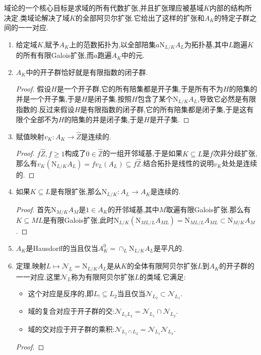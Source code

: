 域论的一个核心目标是求域的所有代数扩张,并且扩张理应被基域$K$内部的结构所决定.类域论解决了域$K$的全部阿贝尔扩张.它给出了这样的扩张和$A_K$的特定子群之间的一一对应.
\begin{enumerate}
	\item 给定域$K$,赋予$A_K$上的范数拓扑为,以全部陪集$a\mathrm{N}_{L/K}A_L$为拓扑基,其中$L$跑遍$K$的所有有限Galois扩张,而$a$跑遍$A_K$中的元.
	\item $A_K$中的开子群恰好就是有限指数的闭子群.
	\begin{proof}
		
		假设$H$是一个开子群,它的所有陪集都是开子集,于是所有不为$H$的陪集的并是一个开子集,于是$H$是闭子集.按照$H$包含了某个$\mathrm{N}_{L/K}A_L$,导致它必然是有限指数的.反过来假设$H$是有限指数的闭子群,它的所有陪集都是闭子集,于是这有限个全部不为$H$的陪集的并是闭子集,于是$H$是开子集.
	\end{proof}
    \item 赋值映射$v_K:A_K\to\widehat{Z}$是连续的.
    \begin{proof}
    	
    	$f\widehat{Z},f\ge1$构成了$0\in\widehat{\mathbb{Z}}$的一组开邻域基,于是如果$K\subseteq L$是$f$次非分歧扩张,那么有$v_K(\mathrm{N}_{L/K}A_L)=fv_L(A_L)\subseteq f\widehat{\mathbb{Z}}$.结合拓扑是线性的说明$v_K$处处是连续的.
    \end{proof}
    \item 如果$K\subseteq L$是有限扩张,那么$\mathrm{N}_{L/K}:A_L\to A_K$是连续的.
    \begin{proof}
    	
    	首先$\mathrm{N}_{M/K}A_M$是$1\in A_K$的开邻域基,其中$M$取遍有限Galois扩张.那么有$K\subseteq ML$是有限Galois扩张,此时$\mathrm{N}_{L/K}(\mathrm{N}_{ML/L}A_{ML})=\mathrm{N}_{ML/L}A_{ML}\subset\mathrm{N}_{M/K}A_M$.
    \end{proof}
    \item $A_K$是Hausdorff的当且仅当$A_K^0=\cap_L\mathrm{N}_{L/K}A_L$是平凡的.
    \item 定理.映射$L\mapsto\mathscr{N}_L=\mathrm{N}_{L/K}A_L$是从$K$的全体有限阿贝尔扩张$L$到$A_K$的开子群的一一对应.这里$\mathscr{N}_L$称为有限阿贝尔扩张$L$的类域.它满足:
    \begin{itemize}
    	\item 这个对应是反序的,即$L_!\subseteq L_2$当且仅当$\mathscr{N}_{L_2}\subset\mathscr{N}_{L_1}$.
    	\item 域的复合对应于开子群的交:$\mathscr{N}_{L_1L_2}=\mathscr{N}_{L_1}\cap\mathscr{N}_{L_2}$.
    	\item 域的交对应于开子群的乘积:$\mathscr{N}_{L_1\cap L_2}=\mathscr{N}_{L_1}\mathscr{N}_{L_2}$.
    \end{itemize}
    \begin{proof}
    	

\end{proof}
\end{enumerate}
